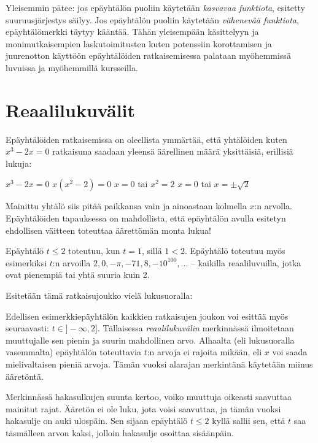 Yleisemmin pätee: jos epäyhtälön puoliin käytetään \emph{kasvavaa funktiota}, esitetty suuruusjärjestys säilyy. Jos epäyhtälön puoliin käytetään \emph{vähenevää funktiota}, epäyhtälömerkki täytyy kääntää. Tähän yleisempään käsittelyyn ja monimutkaisempien laskutoimitusten kuten potenssiin korottamisen ja juurenotton käyttöön epäyhtälöiden ratkaisemisessa palataan myöhemmissä luvuissa ja myöhemmillä kursseilla.

\section{Reaalilukuvälit}

Epäyhtälöiden ratkaisemissa on oleellista ymmärtää, että yhtälöiden kuten $x^3-2x=0$ ratkaisuna saadaan yleensä äärellinen määrä yksittäisiä, erillisiä lukuja:

$x^3-2x=0$
$x(x^2-2)=0$
$x=0$ tai $x^2=2$
$x=0$ tai $x=\pm \sqrt{2}$

Mainittu yhtälö siis pitää paikkansa vain ja ainoastaan kolmella $x$:n arvolla. Epäyhtälöiden tapauksessa on mahdollista, että epäyhtälön avulla esitetyn ehdollisen väitteen toteuttaa äärettömän monta lukua!

\begin{esimerkki}
Epäyhtälö $t \leq 2$ toteutuu, kun $t=1$, sillä $1<2$. Epäyhtälö toteutuu myös esimerkiksi $t$:n arvoilla $2, 0, -\pi, -71,8, -10^{100}, ...$ – kaikilla reaaliluvuilla, jotka ovat pienempiä tai yhtä suuria kuin 2.
\end{esimerkki}

Esitetään tämä ratkaisujoukko vielä lukusuoralla:

\begin{lukusuora}{-6}{10}{6}
\end{lukusuora}

Edellisen esimerkkiepäyhtälön kaikkien ratkaisujen joukon voi esittää myös seuraavasti: $t\in ]-\infty, 2]$. Tällaisessa \emph{reaalilukuvälin} merkinnässä ilmoitetaan muuttujalle sen pienin ja suurin mahdollinen arvo. Alhaalta (eli lukusuoralla vasemmalta) epäyhtälön toteuttavia $t$:n arvoja ei rajoita mikään, eli $x$ voi saada mielivaltaisen pieniä arvoja. Tämän vuoksi alarajan merkintänä käytetään miinus ääretöntä.

Merkinnässä hakasulkujen suunta kertoo, voiko muuttuja oikeasti saavuttaa mainitut rajat. Ääretön ei ole luku, jota voisi saavuttaa, ja tämän vuoksi hakasulje on auki ulospäin. Sen sijaan epäyhtälö $t \leq 2$ kyllä sallii sen, että $t$ saa täsmälleen arvon kaksi, jolloin hakasulje osoittaa sisäänpäin.

